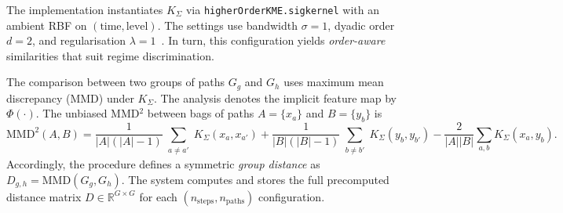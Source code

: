 The implementation instantiates $K_\Sigma$ via \texttt{higherOrderKME.sigkernel} with an ambient RBF on $(\text{time},\text{level})$. The settings use bandwidth $\sigma=1$, dyadic order $d=2$, and regularisation $\lambda=1$~\cite{salvi2021higher}. In turn, this configuration yields \emph{order-aware} similarities that suit regime discrimination.

The comparison between two groups of paths $G_g$ and $G_h$ uses maximum mean discrepancy (MMD) under $K_\Sigma$. The analysis denotes the implicit feature map by $\Phi(\cdot)$. The unbiased MMD$^2$ between bags of paths $A=\{x_a\}$ and $B=\{y_b\}$ is
\[
\mathrm{MMD}^2(A,B)
= \frac{1}{|A|(|A|-1)}\!\!\sum_{\substack{a\neq a'}}\! K_\Sigma(x_a,x_{a'})
+ \frac{1}{|B|(|B|-1)}\!\!\sum_{\substack{b\neq b'}}\! K_\Sigma(y_b,y_{b'})
- \frac{2}{|A||B|}\sum_{a,b} K_\Sigma(x_a,y_b).
\]
Accordingly, the procedure defines a symmetric \emph{group distance} as $D_{g,h}=\mathrm{MMD}(G_g,G_h)$. The system computes and stores the full precomputed distance matrix $D\in\mathbb{R}^{G\times G}$ for each $(n_{\text{steps}},n_{\text{paths}})$ configuration.


